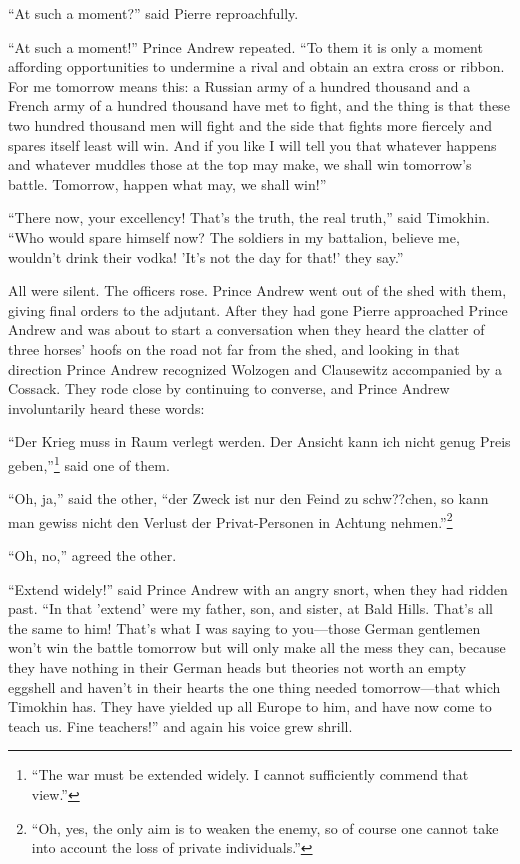 ``At such a moment?'' said Pierre reproachfully.

``At such a moment!'' Prince Andrew repeated. ``To them it is
only a moment affording opportunities to undermine a rival and
obtain an extra cross or ribbon. For me tomorrow means this: a
Russian army of a hundred thousand and a French army of a hundred
thousand have met to fight, and the thing is that these two
hundred thousand men will fight and the side that fights more
fiercely and spares itself least will win. And if you like I will
tell you that whatever happens and whatever muddles those at the
top may make, we shall win tomorrow's battle. Tomorrow, happen
what may, we shall win!''

``There now, your excellency! That's the truth, the real truth,''
said Timokhin. ``Who would spare himself now? The soldiers in my
battalion, believe me, wouldn't drink their vodka! 'It's not the
day for that!'  they say.''

All were silent. The officers rose. Prince Andrew went out of the
shed with them, giving final orders to the adjutant. After they
had gone Pierre approached Prince Andrew and was about to start a
conversation when they heard the clatter of three horses' hoofs
on the road not far from the shed, and looking in that direction
Prince Andrew recognized Wolzogen and Clausewitz accompanied by a
Cossack. They rode close by continuing to converse, and Prince
Andrew involuntarily heard these words:

``Der Krieg muss in Raum verlegt werden. Der Ansicht kann ich
nicht genug Preis geben,''\footnote{``The war must be extended
widely. I cannot sufficiently commend that view.''} said one of
them.

``Oh, ja,'' said the other, ``der Zweck ist nur den Feind zu
schw??chen, so kann man gewiss nicht den Verlust der
Privat-Personen in Achtung nehmen.''\footnote{``Oh, yes, the only
aim is to weaken the enemy, so of course one cannot take into
account the loss of private individuals.''}

``Oh, no,'' agreed the other.

``Extend widely!'' said Prince Andrew with an angry snort, when
they had ridden past. ``In that 'extend' were my father, son, and
sister, at Bald Hills. That's all the same to him! That's what I
was saying to you---those German gentlemen won't win the battle
tomorrow but will only make all the mess they can, because they
have nothing in their German heads but theories not worth an
empty eggshell and haven't in their hearts the one thing needed
tomorrow---that which Timokhin has. They have yielded up all
Europe to him, and have now come to teach us. Fine teachers!''
and again his voice grew shrill.


